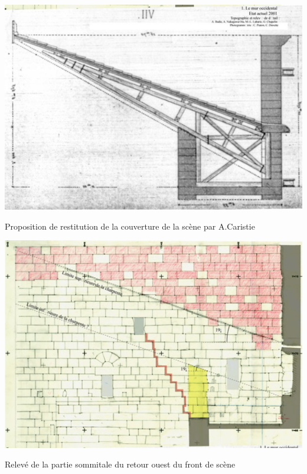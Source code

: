 		
		\begin{figureth}
			\begin{subfigureth}{0.49\textwidth}
				\includegraphics[width=\linewidth]{images/toitCaristie}
				\caption[Couverture de scène proposée par A.Caristie]{Proposition de restitution de la couverture de la scène par A.Caristie}
				\label{toitCaristie}
			\end{subfigureth}	
			\begin{subfigureth}{0.49\textwidth}
				\includegraphics[width=\linewidth]{images/toitBadie}
				\caption[Relevé de la partie sommitale du retour ouest du front de scène]{Relevé de la partie sommitale du retour ouest du front de scène \cite[Fig. 24]{orangeTxt}}
				\label{toitBadie}
			\end{subfigureth}
		\end{figureth}
		
